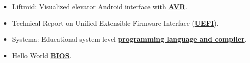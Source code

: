 \documentclass[letterpaper]{twentysecondcv} %
\begin{document}
\begin{itemize}
    \item{Liftroid: Visualized elevator Android interface with \textbf{\underline{AVR}}.}
    \item{Technical Report on Unified Extensible Firmware Interface (\textbf{\underline{UEFI}}).}
    \item{Systema: Educational system-level \textbf{\underline{programming language and compiler}}.}
    \item{Hello World \textbf{\underline{BIOS}}.}
\end{itemize}


%

\end{document}
